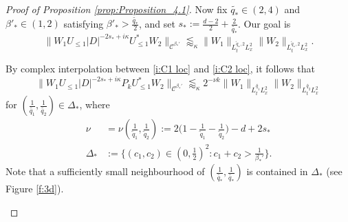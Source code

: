 \documentclass[a4paper]{amsart}
\numberwithin{equation}{section}%
\theoremstyle{plain}%
\theoremstyle{definition}
\theoremstyle{remark}%
\def\C{\mathcal{C}}
\def\C{\mathcal{C}}
\begin{document}
\begin{proof}[Proof of Proposition \ref{prop:Proposition_4.1}]
Now fix $\widetilde{q_*}\in(2,4)$ and $\beta'_* \in (1,2)$ satisfying $\beta'_*>\frac{\widetilde{q_*}}{2}$, and set $s_*:=\frac{d-2}{2}+\frac{2}{\widetilde{q_*}}$. Our goal is 
\begin{equation} \label{e:KTgoal}
    \|W_1U_{\leq 1}|D|^{-2s_*+i\kappa}U_{\leq 1}^*W_2\|_{\C^{\beta_*'}}
\lessapprox_\kappa
    \|W_1\|_{L_t^{\widetilde{q}_*,2}L_x^2}\|W_2\|_{L_t^{\widetilde{q}_*,2}L_x^2}.
\end{equation}


By complex interpolation between \eqref{i:C1 loc} and \eqref{i:C2 loc}, it follows that 
\begin{equation}\label{i:Cbeta'}
    \|W_1U_{\leq 1}|D|^{-2s_*+i\kappa}P_kU_{\leq 1}^*W_2\|_{\C^{\beta_*'}}
\lessapprox_\kappa
    2^{-\nu k} 
    \|W_1\|_{L_t^{\widetilde{q_1}}L_x^2}\|W_2\|_{L_t^{\widetilde{q_2}}L_x^2}
\end{equation}
for $(\frac{1}{\widetilde{q_1}},\frac{1}{\widetilde{q_2}}) \in \Delta_*$, where
\begin{align*}
\nu & = \nu(\tfrac{1}{\widetilde{q}_1},\tfrac{1}{\widetilde{q}_2}) := 2\bigg(1 - \frac{1}{\widetilde{q}_1} - \frac{1}{\widetilde{q}_2}\bigg) - d + 2s_* \\
\Delta_* & := \{(c_1,c_2)\in (0,\tfrac{1}{2})^2: c_1 + c_2 >\tfrac{1}{\beta_*'}\}.
\end{align*}
Note that a sufficiently small neighbourhood of $(\frac{1}{\widetilde{q_*}},\frac{1}{\widetilde{q_*}})$ is contained in $\Delta_*$ (see Figure \ref{f:3d}). 
\begin{figure}[t]
\begin{center}
\end{center}
\end{figure}
\end{proof}
\end{document}
